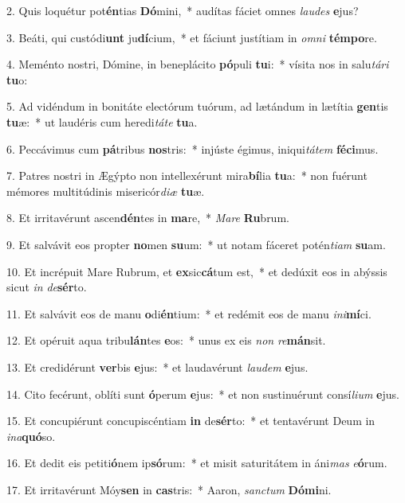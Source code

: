2. Quis loquétur pot\textbf{én}tias \textbf{Dó}mini,~*  audítas fáciet omnes \textit{lau}\textit{des} \textbf{e}jus?\

3. Beáti, qui custódi\textbf{unt} ju\textbf{dí}cium,~*  et fáciunt justítiam in \textit{om}\textit{ni} \textbf{tém}\textbf{po}re.\

4. Meménto nostri, Dómine, in beneplácito \textbf{pó}puli \textbf{tu}i:~*  vísita nos in salu\textit{tá}\textit{ri} \textbf{tu}o:\

5. Ad vidéndum in bonitáte electórum tuórum, ad lætándum in lætítia \textbf{gen}tis \textbf{tu}æ:~*  ut laudéris cum heredi\textit{tá}\textit{te} \textbf{tu}a.\

6. Peccávimus cum \textbf{pá}tribus \textbf{nos}tris:~*  injúste égimus, iniqui\textit{tá}\textit{tem} \textbf{fé}\textbf{ci}mus.\

7. Patres nostri in Ægýpto non intellexérunt mira\textbf{bí}lia \textbf{tu}a:~*  non fuérunt mémores multitúdinis misericór\textit{di}\textit{æ} \textbf{tu}æ.\

8. Et irritavérunt ascen\textbf{dén}tes in \textbf{ma}re,~*  \textit{Ma}\textit{re} \textbf{Ru}brum.\

9. Et salvávit eos propter \textbf{no}men \textbf{su}um:~*  ut notam fáceret potén\textit{ti}\textit{am} \textbf{su}am.\

10. Et incrépuit Mare Rubrum, et \textbf{ex}sic\textbf{cá}tum est,~*  et dedúxit eos in abýssis sicut \textit{in} \textit{de}\textbf{sér}to.\

11. Et salvávit eos de manu \textbf{o}di\textbf{én}tium:~*  et redémit eos de manu \textit{in}\textit{i}\textbf{mí}ci.\

12. Et opéruit aqua tribu\textbf{lán}tes \textbf{e}os:~*  unus ex eis \textit{non} \textit{re}\textbf{mán}sit.\

13. Et credidérunt \textbf{ver}bis \textbf{e}jus:~*  et laudavérunt \textit{lau}\textit{dem} \textbf{e}jus.\

14. Cito fecérunt, oblíti sunt \textbf{ó}perum \textbf{e}jus:~*  et non sustinuérunt consí\textit{li}\textit{um} \textbf{e}jus.\

15. Et concupiérunt concupiscéntiam \textbf{in} de\textbf{sér}to:~*  et tentavérunt Deum in \textit{in}\textit{a}\textbf{quó}so.\

16. Et dedit eis petiti\textbf{ó}nem ip\textbf{só}rum:~*  et misit saturitátem in áni\textit{mas} \textit{e}\textbf{ó}rum.\

17. Et irritavérunt Móy\textbf{sen} in \textbf{cas}tris:~*  Aaron, \textit{sanc}\textit{tum} \textbf{Dó}\textbf{mi}ni.\

